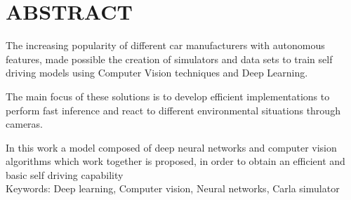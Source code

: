 \section*{\hspace{6.4cm}ABSTRACT}
The increasing popularity of different car manufacturers with autonomous features, made possible the creation of simulators and data sets to train self driving models using Computer Vision techniques and Deep Learning.

The main focus of these solutions is to develop efficient implementations to perform fast inference and react to different environmental situations through cameras.

In this work a model composed of deep neural networks and computer vision algorithms which work together is proposed, in order to obtain an efficient and basic self driving capability\\

\noindent Keywords: Deep learning, Computer vision, Neural networks, Carla simulator